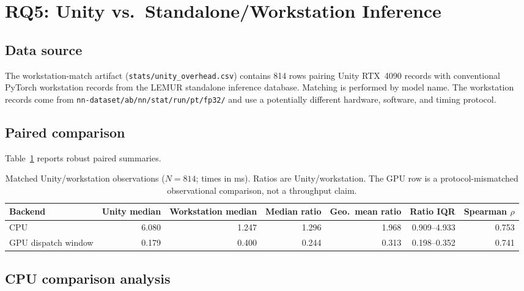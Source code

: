 \documentclass[10pt,twocolumn,letterpaper]{article}
\begin{document}
\section{RQ5: Unity vs.\ Standalone/Workstation Inference}\label{sec:rq5}

\subsection{Data source}

The workstation-match artifact (\texttt{stats/unity\_overhead.csv}) contains 814 rows pairing Unity RTX~4090 records with conventional PyTorch workstation records from the LEMUR standalone inference database. Matching is performed by model name. The workstation records come from \texttt{nn-dataset/ab/nn/stat/run/pt/fp32/} and use a potentially different hardware, software, and timing protocol.

\subsection{Paired comparison}

Table~\ref{tab:workstation} reports robust paired summaries.

\begin{table}[t]
\centering\small
\begin{tabular}{lrrrrrr}
\toprule
Backend & Unity median & Workstation median & Median ratio & Geo.\ mean ratio & Ratio IQR & Spearman $\rho$ \\
\midrule
CPU & 6.080 & 1.247 & 1.296 & 1.968 & 0.909--4.933 & 0.753 \\
GPU dispatch window & 0.179 & 0.400 & 0.244 & 0.313 & 0.198--0.352 & 0.741 \\
\bottomrule
\end{tabular}
\caption{Matched Unity/workstation observations ($N = 814$; times in ms). Ratios are Unity/workstation. The GPU row is a protocol-mismatched observational comparison, not a throughput claim.}
\label{tab:workstation}
\end{table}

\subsection{CPU comparison analysis}
\end{document}
